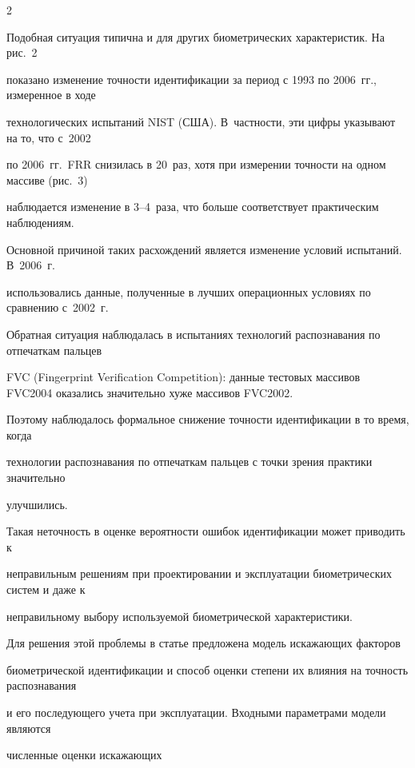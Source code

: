 \begin{multicols}{2}
  


  Подобная ситуация типична и для других биометрических характеристик. На рис.~2 


показано изменение точности идентификации за период с 1993 по 2006~гг., измеренное в ходе 


технологических испытаний NIST (США). В~частности, эти цифры указывают на то, что с~2002 


по 2006~гг.\ FRR снизилась в 20~раз, хотя при измерении точности на одном массиве (рис.~3)


наблюдается изменение в 3--4~раза, что больше соответствует практическим наблюдениям. 


Основной причиной таких рас\-хож\-де\-ний является изменение условий испытаний. В~2006~г.\ 


использовались данные, полученные в лучших операционных условиях по сравнению с~2002~г.\ 





Обрат\-ная си\-ту\-а\-ция наблюдалась в испытаниях технологий распознавания по отпечаткам пальцев 


FVC (Fingerprint Verification Competition): данные тестовых массивов FVC2004 оказались значительно хуже массивов FVC2002. 


Поэтому наблюдалось формальное снижение точности идентификации в то время, когда 


технологии распознавания по отпечаткам пальцев с точки зрения практики значительно 


улучшились.





  Такая неточность в оценке вероятности ошибок идентификации может приводить к 


не\-пра\-вильным решениям при проектировании и эксплуатации биометрических систем и даже к 


неправильному выбору используемой биометрической характеристики.


  


  Для решения этой проблемы в статье предложена модель искажающих факторов 


биометрической идентификации и способ оценки степени их влияния на точность распознавания 


и его последующего учета при эксплуатации. Входными параметрами модели являются 


численные оценки искажающих\linebreak\vspace*{-12pt}


\pagebreak





\end{multicols}






